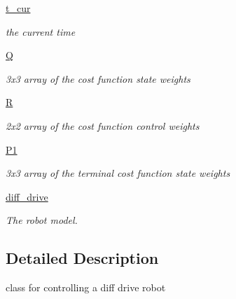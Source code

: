 \begin{DoxyCompactItemize}
\hyperlink{classmppi__control_1_1mppi__lib_1_1mppi_af081d09b4ae3afab898e57cfe2c8fc7f}{t\+\_\+cur}
\begin{DoxyCompactList}\small\item\em the current time \end{DoxyCompactList}\item 
\mbox{\label{classmppi__control_1_1mppi__lib_1_1mppi_aeb8c77f8575d92ea4192f5a84c79ffd8}} 
\hyperlink{classmppi__control_1_1mppi__lib_1_1mppi_aeb8c77f8575d92ea4192f5a84c79ffd8}{Q}
\begin{DoxyCompactList}\small\item\em 3x3 array of the cost function state weights \end{DoxyCompactList}\item 
\mbox{\label{classmppi__control_1_1mppi__lib_1_1mppi_a67ff8a6e353fe0d6c3f6ed6fe27448da}} 
\hyperlink{classmppi__control_1_1mppi__lib_1_1mppi_a67ff8a6e353fe0d6c3f6ed6fe27448da}{R}
\begin{DoxyCompactList}\small\item\em 2x2 array of the cost function control weights \end{DoxyCompactList}\item 
\mbox{\label{classmppi__control_1_1mppi__lib_1_1mppi_a930d221e939ac8f594941d05c77ab853}} 
\hyperlink{classmppi__control_1_1mppi__lib_1_1mppi_a930d221e939ac8f594941d05c77ab853}{P1}
\begin{DoxyCompactList}\small\item\em 3x3 array of the terminal cost function state weights \end{DoxyCompactList}\item 
\mbox{\label{classmppi__control_1_1mppi__lib_1_1mppi_a3e8d7c700744ceab4964899506619b7c}} 
\hyperlink{classmppi__control_1_1mppi__lib_1_1mppi_a3e8d7c700744ceab4964899506619b7c}{diff\+\_\+drive}
\begin{DoxyCompactList}\small\item\em The robot model. \end{DoxyCompactList}\end{DoxyCompactItemize}


\subsection{Detailed Description}
class for controlling a diff drive robot 

